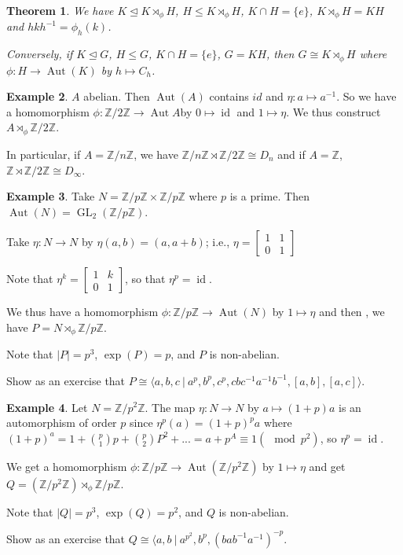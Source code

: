 \documentclass{amsart}
\newtheorem{thm}{Theorem}[section]
\theoremstyle{definition}
\newtheorem{example}[thm]{Example}
\newcommand{\Z}{\mathbb Z}
\DeclareMathOperator{\GL}{GL}
\DeclareMathOperator{\id}{id}
\DeclareMathOperator{\Aut}{Aut}
\begin{document}
\begin{thm}
	We have $K\unlhd K\rtimes_\phi H$, $H\leq K\rtimes_\phi H$, $K\cap H=\{e\}$, $K\rtimes_\phi H=KH$ and $hkh^{-1}=\phi_h(k)$.
	
	Conversely, if $K\unlhd G$, $H\leq G$, $K\cap H=\{e\}$, $G=KH$, then $G\cong K\rtimes_\phi H$ where $\phi:H\to\Aut(K)$ by $h\mapsto C_h$.
\end{thm}
\begin{example}
	$A$ abelian. Then $\Aut(A)$ contains $id$ and $\eta:a\mapsto a^{-1}$. So we have a homomorphism $\phi:\Z/2\Z\to \Aut A$by $0\mapsto \id$ and $1\mapsto \eta$. We thus construct $A\rtimes_\phi \Z/2\Z$.
	
	In particular, if $A=\Z/n\Z$, we have $\Z/n\Z\rtimes \Z/2\Z\cong D_n$ and if $A=\Z$, $\Z\rtimes \Z/2\Z\cong D_\infty$.
\end{example}
\begin{example}
	Take $N=\Z/p\Z\times\Z/p\Z$ where $p$ is a prime. Then $\Aut(N)=\GL_2(\Z/p\Z)$.
	
	Take $\eta:N\to N$ by $\eta(a,b)=(a,a+b)$; i.e., $\eta=\begin{bmatrix}
		1&1\\0&1
	\end{bmatrix}$
	
	Note that $\eta^k=\begin{bmatrix}
		1&k\\0&1
	\end{bmatrix}$, so that $\eta^p=\id$.
	
	We thus have a homomorphism $\phi:\Z/p\Z\to \Aut(N)$ by $1\mapsto \eta$ and then , we have $P=N\rtimes_\phi\Z/p\Z$.
	
	Note that $|P|=p^3$, $\exp(P)=p$, and $P$ is non-abelian. 
\end{example}
 Show as an exercise that $P\cong \langle a,b,c\ |\ a^p,b^p,c^p,cbc^{-1}a^{-1}b^{-1},[a,b],[a,c]\rangle$.
 \begin{example}
 	Let $N=\Z/p^2\Z$. The map $\eta:N\to N$ by $a\mapsto (1+p)a$ is an automorphism of order $p$ since $\eta^p(a)=(1+p)^pa$ where $(1+p)^a=1+\binom{p}{1}p+\binom{p}{2}P^2+...=a+p^A\equiv 1(\mod p^2)$, so $\eta^p=\id$.
 	
 	We get a homomorphism $\phi:\Z/p\Z\to \Aut(\Z/p^{2}\Z)$ by $1\mapsto \eta$ and get $Q=(\Z/p^{2}\Z)\rtimes_\phi \Z/p\Z$.
 	
 	Note that $|Q|=p^3$, $\exp(Q)=p^2$, and $Q$ is non-abelian.
 \end{example}
 
 Show as an exercise that $Q\cong\langle a,b\ |\ a^{p^2}, b^{p}, (bab^{-1}a^{-1})^{-p}$.
 
\end{document}
